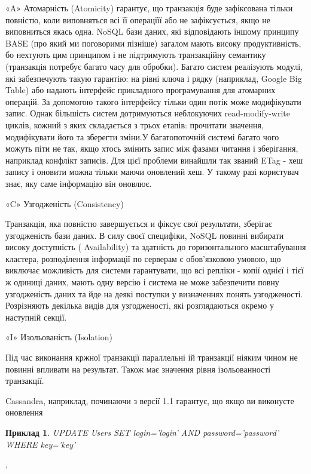 \documentclass[14pt]{vakthesis}
\newtheorem{example}{Приклад}[chapter]
\begin{document}
«A» Атомарність (Atomicity) гарантує, що транзакція буде зафіксована тільки повністю, коли виповняться всі її операціїї або не зафіксується, якщо не виповниться якась одна.
NoSQL бази даних, які відповідають іншому принципу BASE (про який ми поговорими пізніше) загалом мають високу продуктивність, бо нехтують цим принципом і не підтримують транзакційну семантику (транзакція потребує багато часу для обробки). 
Багато систем реалізують модулі, які забезпечують такую гарантію: на рівні ключа і рядку (наприклад, Google Big Table) або надають
інтерфейс прикладного програмування для атомарних операцій. За допомогою такого інтерфейсу тільки один потік може модифікувати запис.
Однак більшість систем дотримуються неблокуючих read-modify-write циклів, кожний з яких складається з трьох етапів: прочитати значення, модифікувати його та зберегти зміни.У багатопоточній системі багато чого можуть піти не так, якщо хтось змінить запис між фазами читання і зберігання, наприклад конфлікт записів. Для цієї проблеми винайшли так званий ETag - хеш запису і оновити можна тільки маючи оновлений хеш. У такому разі користувач знає, яку саме інформацію він оновлює.

«C» Узгодженість (Consistency)

Транзакція, яка повністю завершується и фіксує свої результати, зберігає узгодженість бази даних. 
В силу своєї специфіки, NoSQL повинні вибирати високу доступність ( Availability) та здатність до горизонтального масштабування кластера, розподілення інформації по серверам є обов'язковою умовою, що виключає можливість для системи гарантувати, що всі репліки -  копії однієї і тієї ж одиниці даних, мають одну версію і система не може забезпечити повну узгодженість даних та йде на деякі поступки у визначеннях понять узгодженості. Розрізняють декілька видів для узгодженості, які розглядаються окремо у наступній секції.

«I» Изольованість (Isolation)


Під час виконання кржної транзакції параллельні ій транзакції ніяким чином не повинні впливати на результат. Також має значення рівня ізольованності транзакції.

Cassandra, наприклад, починаючи з версії 1.1 гарантує, що якщо ви виконуєте оновлення

\begin{example}

UPDATE Users
SET login='login' AND password='password'
WHERE key='key'

\end{example} ,
\end{document}
